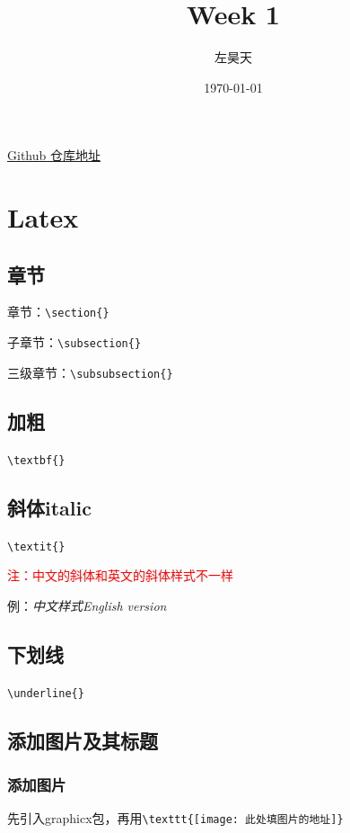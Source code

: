 \documentclass[UTF8]{ctexart}
\title{Week 1}
\author{左昊天}
\date{\today}
\begin{document}
\maketitle
\begin{center}
   \href{https://github.com/eric041224/tool_class_2024_sum}{Github 仓库地址}
\end{center}

\section{Latex}

\subsection{章节}
章节：\verb|\section{}|

子章节：\verb|\subsection{}|

三级章节：\verb|\subsubsection{}|

\subsection{加粗}\verb|\textbf{}|
\subsection{斜体italic}
\verb|\textit{}|  
 
\textcolor{red}{注：中文的斜体和英文的斜体样式不一样}

例：\textit{中文样式}\qquad\textit{English version}

\subsection{下划线}\verb|\underline{}|

\subsection{添加图片及其标题} 
\subsubsection{添加图片} 
先引入graphicx包，再用\verb|\texttt{[image: 此处填图片的地址]}| 
\end{document}
